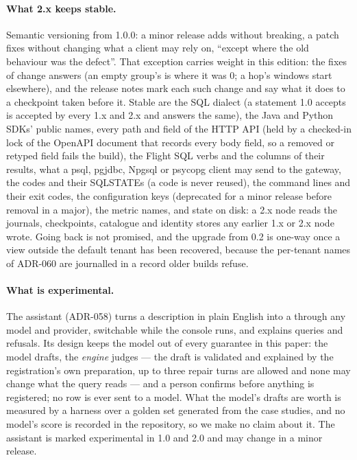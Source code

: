 \documentclass[11pt,a4paper]{article}
\renewcommand{\_}{\oldunderscore\allowbreak}
\newcommand{\code}[1]{\texttt{\pvbreakable{#1}}}
\begin{document}
\paragraph{What 2.x keeps stable.} Semantic versioning from 1.0.0: a minor release adds without
breaking, a patch fixes without changing what a client may rely on, ``except where the old behaviour was
the defect''. That exception carries weight in this edition: the fixes of 
change answers (an empty group's \code{SUM} is \code{NULL} where it was $0$; a hop's windows start
elsewhere), and the release notes mark each such change and say what it does to a checkpoint taken
before it. Stable are the SQL dialect (a statement 1.0 accepts is accepted by every 1.x and 2.x and
answers the same), the Java and Python SDKs' public
names, every path and field of the HTTP API (held by a checked-in lock of the OpenAPI document that
records every body field, so a removed or retyped field fails the build), the Flight SQL verbs and the
columns of their results, what a psql, pgjdbc, Npgsql or psycopg client may send to the gateway, the
\code{PRV-nnnn} codes and their SQLSTATEs (a code is never reused), the command lines and their exit
codes, the configuration keys (deprecated for a minor release before removal in a major), the metric
names, and state on disk: a 2.x node reads the journals, checkpoints, catalogue and identity stores any
earlier 1.x or 2.x node wrote. Going back is not promised, and the upgrade from 0.2 is one-way once a view
outside the default tenant has been recovered, because the per-tenant names of ADR-060 are journalled in
a record older builds refuse.

\paragraph{What is experimental.} The assistant (ADR-058) turns a description in plain English into a
\code{CREATE CONTINUOUS QUERY} through any model and provider, switchable while the console runs, and
explains queries and refusals. Its design keeps the model out of every guarantee in this paper: the
model drafts, the \emph{engine} judges --- the draft is validated and explained by the registration's own
preparation, up to three repair turns are allowed and none may change what the query reads --- and a
person confirms before anything is registered; no row is ever sent to a model. What the model's
drafts are worth is measured by a harness over a golden set generated from the case studies, and no
model's score is recorded in the repository, so we make no claim about it. The assistant is marked
experimental in 1.0 and 2.0 and may change in a minor release.
\end{document}
